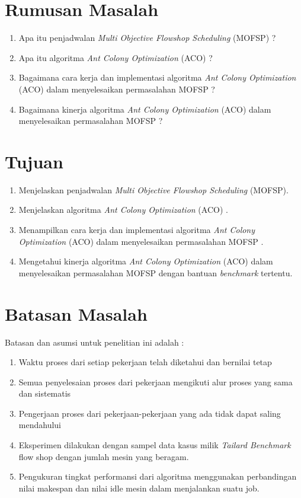 \section{Rumusan Masalah}
\label{sec:rumusan}
\begin{enumerate}
	\item Apa itu penjadwalan {\it Multi Objective Flowshop Scheduling} (MOFSP) ?
	\item Apa itu algoritma {\it Ant Colony Optimization} (ACO) ?
	\item Bagaimana cara kerja dan implementasi algoritma {\it Ant Colony Optimization} (ACO) dalam menyelesaikan permasalahan MOFSP ?
	\item Bagaimana kinerja algoritma {\it Ant Colony Optimization} (ACO) dalam menyelesaikan permasalahan MOFSP ?
	
\end{enumerate}


\section{Tujuan}
\label{sec:tujuan}
\begin{enumerate}
	\item Menjelaskan penjadwalan {\it Multi Objective Flowshop Scheduling} (MOFSP).
	\item Menjelaskan algoritma {\it Ant Colony Optimization} (ACO) .
	\item Menampilkan  cara kerja dan implementasi algoritma {\it Ant Colony Optimization} (ACO) dalam menyelesaikan permasalahan MOFSP .
	\item Mengetahui kinerja algoritma {\it Ant Colony Optimization} (ACO) dalam menyelesaikan permasalahan MOFSP dengan bantuan {\it benchmark} tertentu.
\end{enumerate}



\section{Batasan Masalah}
\label{sec:batasan}

Batasan dan asumsi untuk penelitian ini adalah :

\begin{enumerate}
	\item Waktu proses dari setiap pekerjaan telah diketahui dan bernilai tetap
	\item Semua penyelesaian proses dari pekerjaan mengikuti alur proses yang sama dan sistematis
	\item Pengerjaan proses dari pekerjaan-pekerjaan yang ada tidak dapat saling mendahului
	\item Eksperimen dilakukan dengan sampel data kasus milik {\it Tailard Benchmark} flow shop dengan jumlah mesin yang beragam.
	\item Pengukuran tingkat performansi dari algoritma menggunakan perbandingan nilai makespan dan nilai idle mesin dalam menjalankan suatu job.
	
\end{enumerate}

